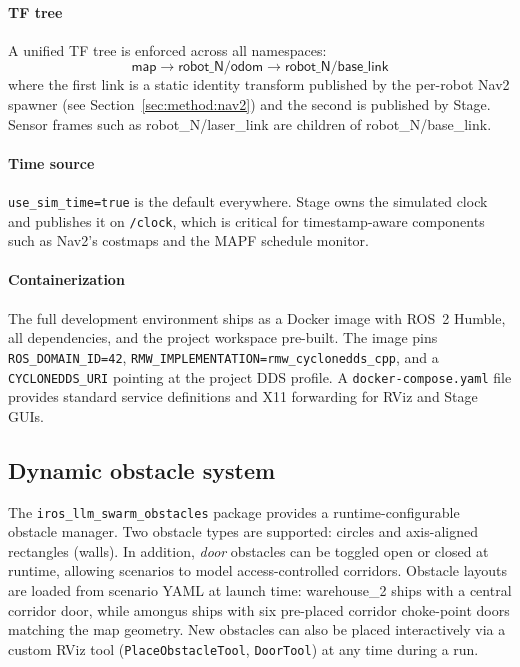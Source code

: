 \documentclass[conference]{IEEEtran}
\begin{document}
\paragraph{TF tree}
A unified TF tree is enforced across all namespaces:
\[
\textsf{map}
  \to \textsf{robot\_N/odom}
  \to \textsf{robot\_N/base\_link}
\]
where the first link is a static identity transform published
by the per-robot Nav2 spawner (see
Section~\ref{sec:method:nav2}) and the second is published by
Stage. Sensor frames such as \textsf{robot\_N/laser\_link} are
children of \textsf{robot\_N/base\_link}.

\paragraph{Time source}
\texttt{use\_sim\_time=true} is the default everywhere. Stage
owns the simulated clock and publishes it on \texttt{/clock},
which is critical for timestamp-aware components such as
Nav2's costmaps and the MAPF schedule monitor.

\paragraph{Containerization}
The full development environment ships as a Docker image with
ROS~2 Humble, all dependencies, and the project workspace
pre-built. The image pins \texttt{ROS\_DOMAIN\_ID=42},
\texttt{RMW\_IMPLEMENTATION=rmw\_cyclonedds\_cpp}, and a
\texttt{CYCLONEDDS\_URI} pointing at the project DDS profile.
A \texttt{docker-compose.yaml} file provides standard service
definitions and X11 forwarding for RViz and Stage GUIs.

\subsection{Dynamic obstacle system}

The \texttt{iros\_llm\_swarm\_obstacles} package provides a
runtime-configurable obstacle manager. Two obstacle types are
supported: circles and axis-aligned rectangles (walls). In
addition, \emph{door} obstacles can be toggled open or closed
at runtime, allowing scenarios to model access-controlled
corridors. Obstacle layouts are loaded from scenario YAML at
launch time: \textsf{warehouse\_2} ships with a central
corridor door, while \textsf{amongus} ships with six
pre-placed corridor choke-point doors matching the map
geometry. New obstacles can also be placed interactively via a
custom RViz tool (\texttt{PlaceObstacleTool},
\texttt{DoorTool}) at any time during a run.
\end{document}
